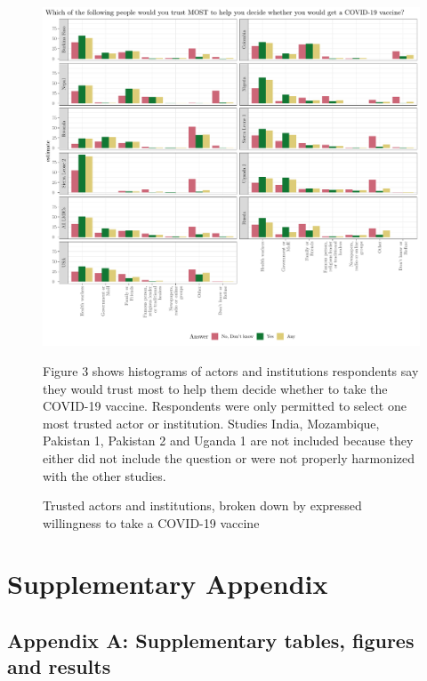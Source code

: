 \documentclass[
  12pt,
]{article}
\begin{document}
\begin{figure}[!ht]
\caption{Trusted actors and institutions, broken down by expressed willingness to take a COVID-19 vaccine \label{fig:fig3paper}}

\newpage

\includegraphics{paper_files/figure-latex/fig3paper-1.pdf}
\newpage

\scriptsize{Figure 3 shows histograms of actors and institutions respondents say they would trust most to help them decide whether to take the COVID-19 vaccine. Respondents were only permitted to select one most trusted actor or institution. Studies India, Mozambique, Pakistan 1, Pakistan 2 and Uganda 1 are not included because they either did not include the question or were not properly harmonized with the other studies.}
\end{figure}

\clearpage

\hypertarget{supplementary-appendix}{%
\section*{Supplementary Appendix}\label{supplementary-appendix}}

\hypertarget{appendixd}{%
\subsection*{Appendix A: Supplementary tables, figures and results}\label{appendixd}}
\end{document}
